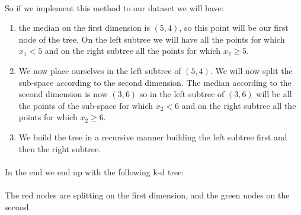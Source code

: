 \documentclass[11 pt]{article}
\begin{document}
\paragraph{}So if we implement this method to our dataset we will have:\\
\begin{enumerate}
  \item the median on the first dimension is $(5,4)$, so this point will be our first node of the tree. On the left subtree we will have all the points for which $x_1<5$ and on the right subtree all the points for which $x_2\geq5$.
  \item We now place ourselves in the left subtree of $(5,4)$. We will now split the sub-space according to the second dimension. The median according to the second dimension is now $(3,6)$ so in the left subtree of $(3,6)$ will be all the points of the sub-space for which $x_2<6$ and on the right subtree all the points for which $x_2\geq6$.
  \item We build the tree in a recursive manner building the left subtree first and then the right subtree.
\end{enumerate}
\paragraph{}In the end we end up with the following k-d tree:\\
\begin{center}
  \medskip
{}
\paragraph{}The red nodes are splitting on the first dimension, and the green nodes on the second.
\end{center}
\end{document}
